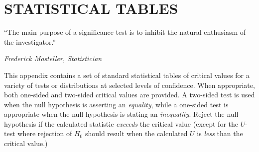 \chapter{STATISTICAL TABLES}
\label{ch:tables}
\epigraph{``The main purpose of a significance test is to inhibit the natural enthusiasm of the investigator.''}{\textit{Frederick Mosteller, Statistician}}
This appendix contains a set of standard statistical tables of critical values
for a variety of tests or distributions at selected levels of confidence.  When appropriate,
both one-sided and two-sided critical values are provided.  A two-sided test is used when
the null hypothesis is asserting an \emph{equality}, while a one-sided test is appropriate when the
null hypothesis is stating an \emph{inequality}.  Reject the null hypothesis
if the calculated statistic \emph{exceeds} the critical value (except for the $U$-test where rejection of $H_0$ should result when the calculated $U$ is \emph{less} than the critical value.)
\vspace{0.25in}

